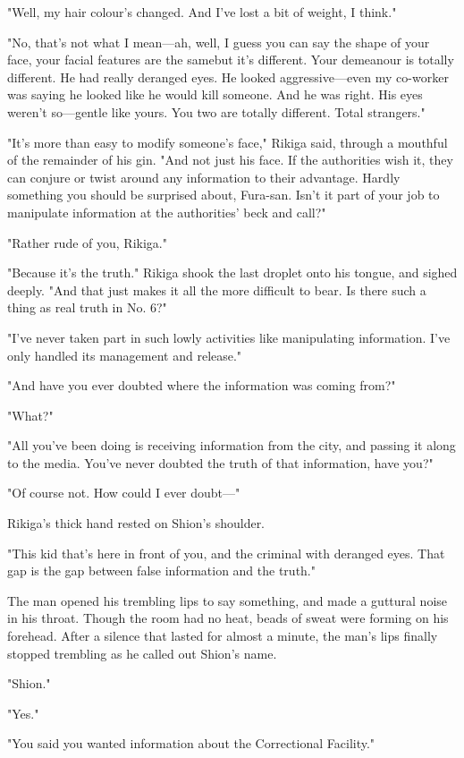 "Well, my hair colour's changed. And I've lost a bit of weight, I
think."

"No, that's not what I mean---ah, well, I guess you can say the shape of
your face, your facial features are the same\el but it's different. Your
demeanour is totally different. He had really deranged eyes. He looked
aggressive---even my co-worker was saying he looked like he would kill
someone. And he was right. His eyes weren't so---gentle like yours. You
two are totally different. Total strangers."

"It's more than easy to modify someone's face," Rikiga said, through a
mouthful of the remainder of his gin. "And not just his face. If the
authorities wish it, they can conjure or twist around any information to
their advantage. Hardly something you should be surprised about,
Fura-san. Isn't it part of your job to manipulate information at the
authorities' beck and call?"

"Rather rude of you, Rikiga."

"Because it's the truth." Rikiga shook the last droplet onto his tongue,
and sighed deeply. "And that just makes it all the more difficult to
bear. Is there such a thing as real truth in No. 6?"

"I've never taken part in such lowly activities like manipulating
information. I've only handled its management and release."

"And have you ever doubted where the information was coming from?"

"What?"

"All you've been doing is receiving information from the city, and
passing it along to the media. You've never doubted the truth of that
information, have you?"

"Of course not. How could I ever doubt---"

Rikiga's thick hand rested on Shion's shoulder.

"This kid that's here in front of you, and the criminal with deranged
eyes. That gap is the gap between false information and the truth."

The man opened his trembling lips to say something, and made a guttural
noise in his throat. Though the room had no heat, beads of sweat were
forming on his forehead. After a silence that lasted for almost a
minute, the man's lips finally stopped trembling as he called out
Shion's name.

"Shion."

"Yes."

"You said you wanted information about the Correctional Facility."

